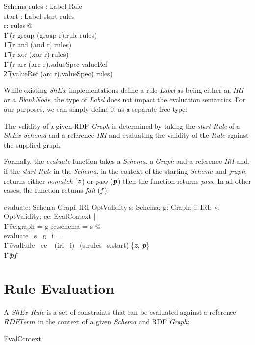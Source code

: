 \documentclass[fuzz]{llncs}
\def\pass{\textbf{\textit{p}}}
\def\fail{\textbf{\textit{f}}}
\def\nomatch{\textbf{\textit{z}}}
\def\zc{\textit}
\begin{document}
\begin{schema}{Schema}
   rules : Label \pfun Rule \\
   start : Label
\where
   start \in \dom rules \\
\forall r: \ran rules @ \\
\t1 (r \in \ran group \implies (group \inv r).rule \in \dom rules) \land \\
\t1 (r \in \ran and \implies \ran (and \inv r) \subseteq \dom rules) \land \\
\t1 (r \in \ran xor \implies \ran (xor \inv r) \subseteq \dom rules) \land \\ 
\t1 (r \in \ran arc \land (arc \inv r).valueSpec \in \ran valueRef \implies \\
\t2 (valueRef \inv (arc \inv r).valueSpec) \in \dom rules)
\end{schema}


While existing $ShEx$ implementations define a rule \zc{Label} as being either an \zc{IRI} or
a \zc{BlankNode}, the type of \zc{Label} does not impact the evaluation semantics.  For our 
purposes, we can simply define it as a separate free type:
\begin{zed}
[Label]
\end{zed}

The validity of a given RDF \zc{Graph} is determined by taking the \zc{start} \zc{Rule} of a
$ShEx$ \zc{Schema} and a reference \zc{IRI} and evaluating the validity of the \zc{Rule} against the supplied graph. 

Formally, the \zc{evaluate} function takes a \zc{Schema}, a \zc{Graph} and a reference \zc{IRI}
and, if the \zc{start} \zc{Rule} in the \zc{Schema}, 
in the context of the starting \zc{Schema} and \zc{graph}, returns either \zc{nomatch} 
($\nomatch$) or \zc{pass} ($\pass$) then the function returns \zc{pass}.  In all other cases,
the function returns \zc{fail} ($\fail$).
\begin{axdef}
   evaluate: Schema \fun Graph \fun IRI \fun OptValidity
\where
   \forall s: Schema; g: Graph; i: IRI; v: OptValidity; ec: EvalContext | \\
\t1 ec.graph = g \land ec.schema = s @ \\
   evaluate ~s ~g ~i = \\
\t1 \IF evalRule ~ec ~ (iri~ i)~ (s.rules~ s.start) \in \{\nomatch, \pass\} \\
\t1 \THEN \pass \ELSE \fail
\end{axdef}

\section{Rule Evaluation}
A $ShEx$ \zc{Rule} is a set of constraints that can be evaluated against a reference ${RDFTerm}$
 in the context of a given \zc{Schema} and RDF \zc{Graph}:
\begin{zed}
EvalContext  \\
\end{zed}
\end{document}
